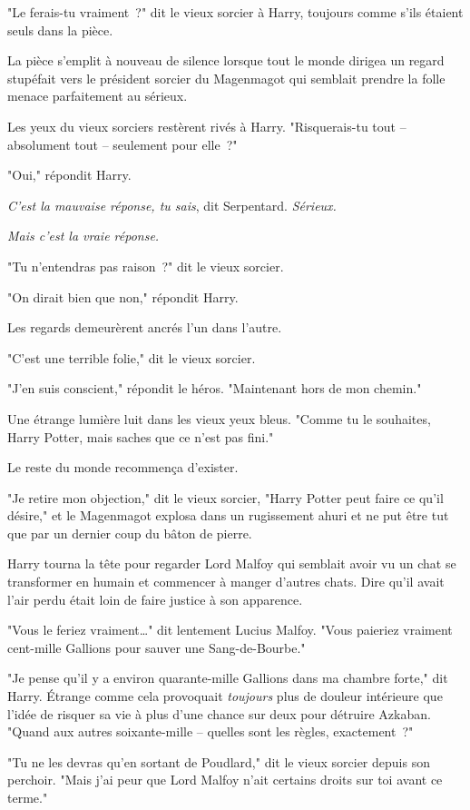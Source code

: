 "Le ferais-tu vraiment~?" dit le vieux sorcier à Harry, toujours comme s'ils étaient seuls dans la pièce.

La pièce s'emplit à nouveau de silence lorsque tout le monde dirigea un regard stupéfait vers le président sorcier du Magenmagot qui semblait prendre la folle menace parfaitement au sérieux.

Les yeux du vieux sorciers restèrent rivés à Harry. "Risquerais-tu tout -- absolument tout -- seulement pour elle~?"

"Oui," répondit Harry.

\emph{C'est la mauvaise réponse, tu sais}, dit Serpentard. \emph{Sérieux.}

\emph{Mais c'est la vraie réponse.}

"Tu n'entendras pas raison~?" dit le vieux sorcier.

"On dirait bien que non," répondit Harry.

Les regards demeurèrent ancrés l'un dans l'autre.

"C'est une terrible folie," dit le vieux sorcier.

"J'en suis conscient," répondit le héros. "Maintenant hors de mon chemin."

Une étrange lumière luit dans les vieux yeux bleus. "Comme tu le souhaites, Harry Potter, mais saches que ce n'est pas fini."

Le reste du monde recommença d'exister.

"Je retire mon objection," dit le vieux sorcier, "Harry Potter peut faire ce qu'il désire," et le Magenmagot explosa dans un rugissement ahuri et ne put être tut que par un dernier coup du bâton de pierre.

Harry tourna la tête pour regarder Lord Malfoy qui semblait avoir vu un chat se transformer en humain et commencer à manger d'autres chats. Dire qu'il avait l'air perdu était loin de faire justice à son apparence.

"Vous le feriez vraiment…" dit lentement Lucius Malfoy. "Vous paieriez vraiment cent-mille Gallions pour sauver une Sang-de-Bourbe."

"Je pense qu'il y a environ quarante-mille Gallions dans ma chambre forte," dit Harry. Étrange comme cela provoquait \emph{toujours} plus de douleur intérieure que l'idée de risquer sa vie à plus d'une chance sur deux pour détruire Azkaban. "Quand aux autres soixante-mille -- quelles sont les règles, exactement~?"

"Tu ne les devras qu'en sortant de Poudlard," dit le vieux sorcier depuis son perchoir. "Mais j'ai peur que Lord Malfoy n'ait certains droits sur toi avant ce terme."

